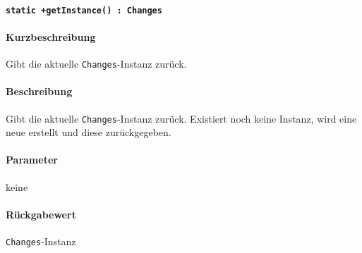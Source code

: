 \paragraph{\texttt{static +getInstance() : Changes}}%
\paragraph*{Kurzbeschreibung}
Gibt die aktuelle \verb#Changes#-Instanz zurück.
\paragraph*{Beschreibung}
Gibt die aktuelle \verb#Changes#-Instanz zurück.
Existiert noch keine Instanz, wird eine neue erstellt und diese zurückgegeben.
\paragraph*{Parameter}
keine
\paragraph*{Rückgabewert}
\verb#Changes#-Instanz